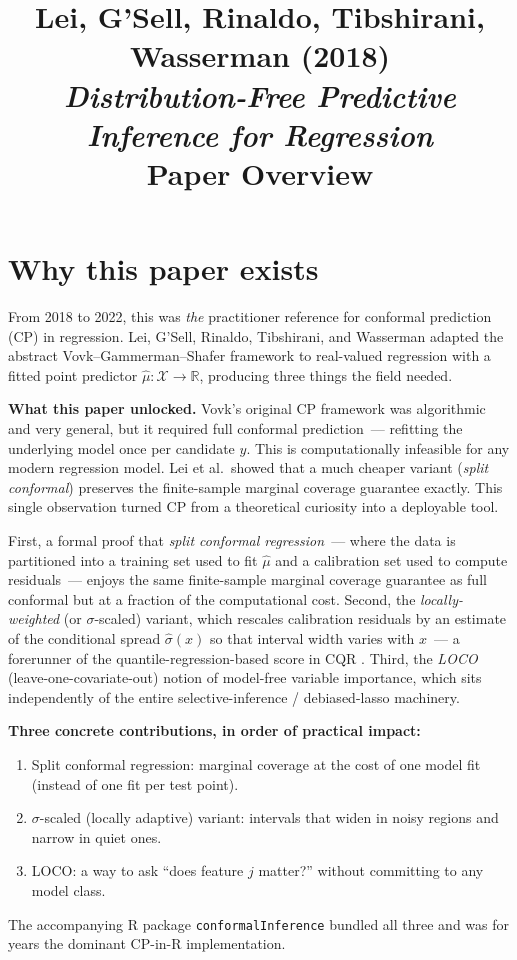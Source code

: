 \documentclass[letterpaper,11pt,leqno]{article}
\title{Lei, G'Sell, Rinaldo, Tibshirani, Wasserman (2018)\\\textit{Distribution-Free Predictive Inference for Regression}\\[2pt]\large Paper Overview}
\author{}
\date{}
\begin{document}
\maketitle

\section{Why this paper exists}\label{s:intro}

From 2018 to 2022, this was \emph{the} practitioner reference for conformal prediction (CP) in regression. Lei, G'Sell, Rinaldo, Tibshirani, and Wasserman \cite{lei2018distribution} adapted the abstract Vovk--Gammerman--Shafer framework \cite{vovk2005algorithmic} to real-valued regression with a fitted point predictor $\hat{\mu}: \mathcal{X} \to \mathbb{R}$, producing three things the field needed.

\begin{keyinsight}
\textbf{What this paper unlocked.} Vovk's original CP framework was algorithmic and very general, but it required full conformal prediction~--- refitting the underlying model once per candidate $y$. This is computationally infeasible for any modern regression model. Lei et al.~showed that a much cheaper variant (\emph{split conformal}) preserves the finite-sample marginal coverage guarantee exactly. This single observation turned CP from a theoretical curiosity into a deployable tool.
\end{keyinsight}

First, a formal proof that \emph{split conformal regression}~--- where the data is partitioned into a training set used to fit $\hat{\mu}$ and a calibration set used to compute residuals~--- enjoys the same finite-sample marginal coverage guarantee as full conformal but at a fraction of the computational cost. Second, the \emph{locally-weighted} (or $\sigma$-scaled) variant, which rescales calibration residuals by an estimate of the conditional spread $\hat{\sigma}(x)$ so that interval width varies with $x$~--- a forerunner of the quantile-regression-based score in CQR \cite{romano2019cqr}. Third, the \emph{LOCO} (leave-one-covariate-out) notion of model-free variable importance, which sits independently of the entire selective-inference / debiased-lasso machinery.

\begin{explain}
\textbf{Three concrete contributions, in order of practical impact:}
\begin{enumerate}
\item Split conformal regression: marginal coverage at the cost of one model fit (instead of one fit per test point).
\item $\sigma$-scaled (locally adaptive) variant: intervals that widen in noisy regions and narrow in quiet ones.
\item LOCO: a way to ask ``does feature $j$ matter?'' without committing to any model class.
\end{enumerate}
The accompanying R package \texttt{conformalInference} bundled all three and was for years the dominant CP-in-R implementation.
\end{explain}
\end{document}
